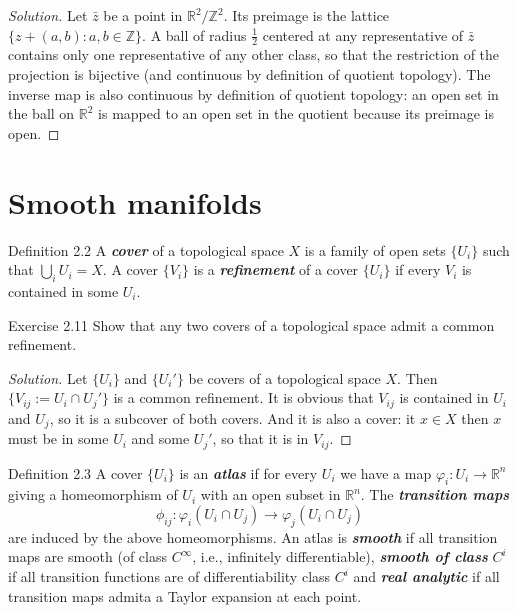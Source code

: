 \begin{proof}[Solution]\leavevmode
Let $\bar{z}$ be a point in $\mathbb{R}^2/\mathbb{Z}^2$. Its preimage is the lattice $\{z+(a,b):a,b \in \mathbb{Z}\}$. A ball of radius  $\frac{1}{2}$ centered at any representative of $\bar{z} $ contains only one representative of any other class, so that the restriction of the projection is bijective (and continuous by definition of quotient topology). The inverse map is also continuous by definition of quotient topology: an open set in the ball on $\mathbb{R}^2$ is mapped to an open set in the quotient because its preimage is open.
\end{proof}

\section{Smooth manifolds}

\begin{thing3}{Definition 2.2}\leavevmode
	A \textit{\textbf{cover}} of a topological space $X$ is a family of open sets $\{U_i\}$ such that $\bigcup_{i} U_i=X$. A cover $\{V_i\}$ is a \textit{\textbf{refinement}} of a cover $\{U_i\}$ if every $V_i$ is contained in some $U_i$.
\end{thing3}

\begin{thing4}{Exercise 2.11}\label{exer:2.11}\leavevmode
Show that any two covers of a topological space admit a common refinement.
\end{thing4}

\begin{proof}[Solution]\leavevmode
Let $\{U_i\}$ and $\{U_i'\}$ be covers of a topological space $X$. Then  $\{V_{ij}:=U_i \cap U_j'\}$ is a common refinement. It is obvious that $V_{ij}$ is contained in $U_i$ and $U_j$, so it is a subcover of both covers. And it is also a cover: it $x \in X$ then $x$ must be in some  $U_i$ and some $U_j'$, so that it is in $V_{ij}$.
\end{proof}

\begin{thing4}{Definition 2.3}\leavevmode
	A cover $\{U_i\}$ is an \textit{\textbf{atlas}} if for every $U_i$ we have a map $\varphi_i:U_i\to \mathbb{R}^n$ giving a homeomorphism of $U_i$ with an open subset in  $\mathbb{R}^n$. The \textit{\textbf{transition maps}} 
	\[\phi_{ij}:\varphi_i(U_i\cap U_j)\to \varphi_j(U_i \cap U_j)\]
	are induced by the above homeomorphisms. An atlas is \textit{\textbf{smooth}} if all transition maps are smooth (of class $C^\infty$, i.e., infinitely differentiable), \textit{\textbf{smooth of class}} $C^i$ if all transition functions are of differentiability class $C^i$ and \textit{\textbf{real analytic}} if all transition maps admita a Taylor expansion at each point.
\end{thing4}

